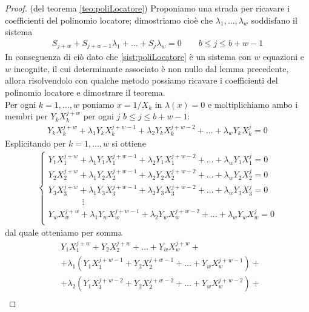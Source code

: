 \begin{proof}(del teorema \ref{teo:poliLocatore})
   Proponiamo una strada per ricavare i coefficienti del polinomio locatore;
   dimostriamo cioè che $\lambda_{1}, \dots ,\lambda_{w}$ soddisfano il sistema
   \begin{align}\label{sist:poliLocatore}
      S_{j+w} + S_{j+w-1}\lambda_{1} + \dots + S_{j}\lambda_{w} = 0 \qquad b \leq j \leq b+w-1
   \end{align}
   In conseguenza di ciò dato che \ref{sist:poliLocatore} è un sistema con $w$ equazioni e $w$ incognite, il cui determinante associato è non nullo dal lemma precedente, allora risolvendolo con qualche metodo possiamo ricavare i coefficienti del polinomio locatore e dimostrare il teorema.\\
   Per ogni $k=1, \dots, w$ poniamo $x=1/X_{k}$ in $\lambda(x) = 0$ e moltiplichiamo ambo i membri per $Y_{k}X_{k}^{j+w}$ per ogni $j$ $b \leq j \leq b+w-1$:
   \begin{align*}
      Y_{k}X_{k}^{j+w} + \lambda_{1}Y_{k}X_{k}^{j+w-1} + \lambda_{2}Y_{k}X_{k}^{j+w-2} + \dots + \lambda_{w}Y_{k}X_{k}^{j} = 0
   \end{align*}
   Esplicitando per $k=1, \dots, w$ si ottiene
   \begin{align*}
      \left\{
 	\begin{array} {l}
 	Y_{1}X_{1}^{j+w} + \lambda_{1}Y_{1}X_{1}^{j+w-1} + \lambda_{2}Y_{1}X_{1}^{j+w-2} + \dots + \lambda_{w}Y_{1}X_{1}^{j} = 0 \\
 	Y_{2}X_{2}^{j+w} + \lambda_{1}Y_{2}X_{2}^{j+w-1} + \lambda_{2}Y_{2}X_{2}^{j+w-2} + \dots + \lambda_{w}Y_{2}X_{2}^{j} = 0 \\
 	Y_{3}X_{3}^{j+w} + \lambda_{1}Y_{3}X_{3}^{j+w-1} + \lambda_{2}Y_{3}X_{3}^{j+w-2} + \dots + \lambda_{w}Y_{3}X_{3}^{j} = 0 \\
 	\qquad \qquad \vdots \\
 	Y_{w}X_{w}^{j+w} + \lambda_{1}Y_{w}X_{w}^{j+w-1} + \lambda_{2}Y_{w}X_{w}^{j+w-2} + \dots + \lambda_{w}Y_{w}X_{w}^{j} = 0 \\
 	\end{array}
 	\right.
   \end{align*}
   dal quale otteniamo per somma
   \begin{align*}
      &Y_{1}X_{1}^{j+w} + Y_{2}X_{2}^{j+w} + \dots + Y_{w}X_{w}^{j+w} + \\
      &+ \lambda_{1}( Y_{1}X_{1}^{j+w-1} + Y_{2}X_{2}^{j+w-1} + \dots + Y_{w}X_{w}^{j+w-1}) + \\
      &+ \lambda_{2}( Y_{1}X_{1}^{j+w-2} + Y_{2}X_{2}^{j+w-2} + \dots + Y_{w}X_{w}^{j+w-2}) + \\

\end{align*}
\end{proof}
